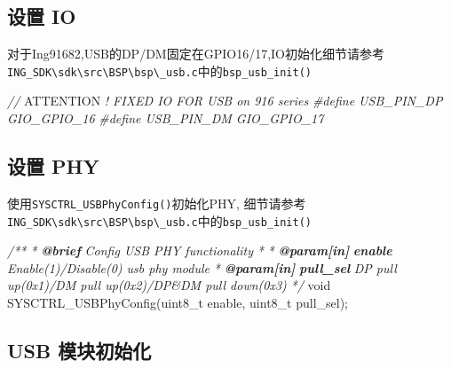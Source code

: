\documentclass[
  12pt,
]{book}
\newenvironment{Shaded}{\begin{snugshade}}{\end{snugshade}}
\newcommand{\AlertTok}[1]{\textcolor[rgb]{0.94,0.16,0.16}{#1}}
\newcommand{\AnnotationTok}[1]{\textcolor[rgb]{0.56,0.35,0.01}{\textbf{\textit{#1}}}}
\newcommand{\CommentTok}[1]{\textcolor[rgb]{0.56,0.35,0.01}{\textit{#1}}}
\newcommand{\CommentVarTok}[1]{\textcolor[rgb]{0.56,0.35,0.01}{\textbf{\textit{#1}}}}
\newcommand{\DataTypeTok}[1]{\textcolor[rgb]{0.13,0.29,0.53}{#1}}
\newcommand{\NormalTok}[1]{#1}
\newcommand{\PreprocessorTok}[1]{\textcolor[rgb]{0.56,0.35,0.01}{\textit{#1}}}
\begin{document}
\hypertarget{ux8bbeux7f6e-io}{%
\subsection{设置 IO}\label{ux8bbeux7f6e-io}}

对于Ing91682,USB的DP/DM固定在GPIO16/17,IO初始化细节请参考\texttt{ING\_SDK\textbackslash{}sdk\textbackslash{}src\textbackslash{}BSP\textbackslash{}bsp\textbackslash{}\_usb.c}中的\texttt{bsp\_usb\_init()}

\begin{Shaded}
\begin{Highlighting}[]
\CommentTok{// }\AlertTok{ATTENTION}\CommentTok{ ! FIXED IO FOR USB on 916 series}
\PreprocessorTok{#define USB_PIN_DP GIO_GPIO_16}
\PreprocessorTok{#define USB_PIN_DM GIO_GPIO_17}
\end{Highlighting}
\end{Shaded}

\hypertarget{ux8bbeux7f6e-phy}{%
\subsection{设置 PHY}\label{ux8bbeux7f6e-phy}}

使用\texttt{SYSCTRL\_USBPhyConfig()}初始化PHY, 细节请参考\texttt{ING\_SDK\textbackslash{}sdk\textbackslash{}src\textbackslash{}BSP\textbackslash{}bsp\textbackslash{}\_usb.c}中的\texttt{bsp\_usb\_init()}

\begin{Shaded}
\begin{Highlighting}[]
\CommentTok{/**}
\CommentTok{ * }\AnnotationTok{@brief}\CommentTok{ Config USB PHY functionality}
\CommentTok{ *}
\CommentTok{ * }\AnnotationTok{@param[in]}\CommentTok{ }\CommentVarTok{enable}\CommentTok{            Enable(1)/Disable(0) usb phy module}
\CommentTok{ * }\AnnotationTok{@param[in]}\CommentTok{ }\CommentVarTok{pull_sel}\CommentTok{          DP pull up(0x1)/DM pull up(0x2)/DP&DM pull down(0x3)}
\CommentTok{ */}
\DataTypeTok{void}\NormalTok{ SYSCTRL_USBPhyConfig(}\DataTypeTok{uint8_t}\NormalTok{ enable, }\DataTypeTok{uint8_t}\NormalTok{ pull_sel);}
\end{Highlighting}
\end{Shaded}

\hypertarget{usb-ux6a21ux5757ux521dux59cbux5316}{%
\subsection{USB 模块初始化}\label{usb-ux6a21ux5757ux521dux59cbux5316}}
\end{document}
